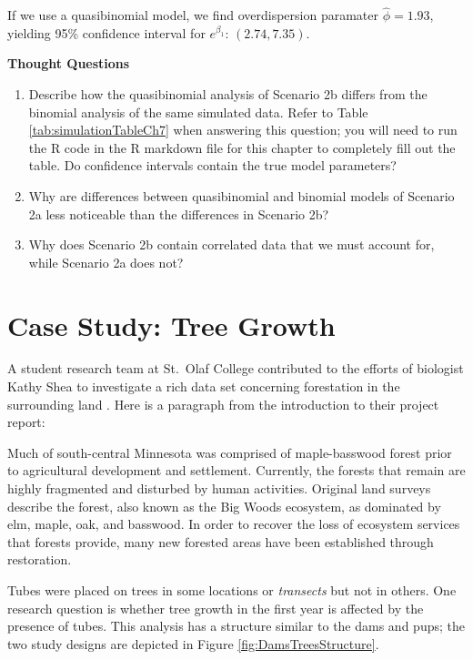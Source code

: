 \documentclass[
]{krantz}
\renewenvironment{quote}{\begin{VF}}{\end{VF}}
\begin{document}
If we use a quasibinomial model, we find overdispersion paramater \(\widehat{\phi} = 1.93\), yielding 95\% confidence interval for \(e^{\beta_1}\): \((2.74, 7.35)\).

\vspace{5mm}

\textbf{Thought Questions}

\begin{enumerate}
\def\labelenumi{\arabic{enumi}.}
\setcounter{enumi}{8}
\item
  Describe how the quasibinomial analysis of Scenario 2b differs from the binomial analysis of the same simulated data. Refer to Table \ref{tab:simulationTableCh7} when answering this question; you will need to run the R code in the R markdown file for this chapter to completely fill out the table. Do confidence intervals contain the true model parameters?
\item
  Why are differences between quasibinomial and binomial models of Scenario 2a less noticeable than the differences in Scenario 2b?
\item
  Why does Scenario 2b contain correlated data that we must account for, while Scenario 2a does not?
\end{enumerate}

\section{Case Study: Tree Growth}\label{case-study-tree-growth}

A student research team at St.~Olaf College contributed to the efforts of biologist Kathy Shea to investigate a rich data set concerning forestation in the surrounding land \citep{Eisinger2011}. Here is a paragraph from the introduction to their project report:

\begin{quote}
Much of south-central Minnesota was comprised of maple-basswood forest prior to agricultural development and settlement. Currently, the forests that remain are highly fragmented and disturbed by human activities. Original land surveys describe the forest, also known as the Big Woods ecosystem, as dominated by elm, maple, oak, and basswood. In order to recover the loss of ecosystem services that forests provide, many new forested areas have been established through restoration.
\end{quote}

Tubes were placed on trees in some locations or \emph{transects} but not in others. One research question is whether tree growth in the first year is affected by the presence of tubes. This analysis has a structure similar to the dams and pups; the two study designs are depicted in Figure \ref{fig:DamsTreesStructure}.
\end{document}
